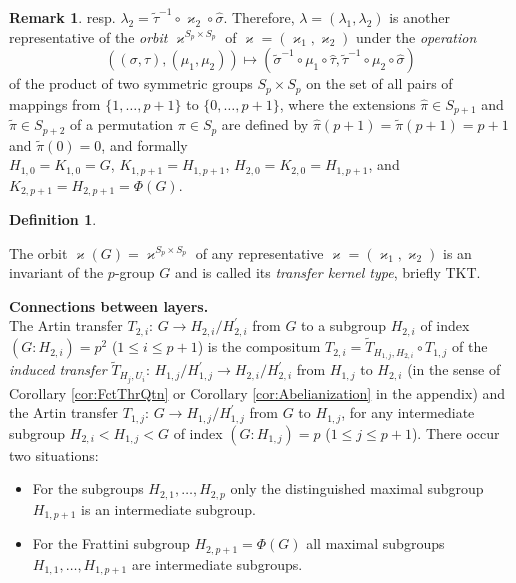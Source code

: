 \documentclass{amsart}
\theoremstyle{definition}
\newtheorem{definition}{Definition}[section]
\newtheorem{remark}{Remark}[section]
\numberwithin{equation}{section}
\begin{document}
\begin{remark}
resp. \(\lambda_2=\tilde{\tau}^{-1}\circ\varkappa_2\circ\hat{\sigma}\).
Therefore, \(\lambda=(\lambda_1,\lambda_2)\) is another representative
of the \textit{orbit} \(\varkappa^{S_p\times S_p}\) of \(\varkappa=(\varkappa_1,\varkappa_2)\)
under the \textit{operation}
\[((\sigma,\tau),(\mu_1,\mu_2))\mapsto
(\tilde{\sigma}^{-1}\circ\mu_1\circ\hat\tau,\tilde{\tau}^{-1}\circ\mu_2\circ\hat\sigma)\]
of the product of two symmetric groups \(S_p\times S_p\)
on the set of all pairs of mappings from \(\lbrace 1,\ldots,p+1\rbrace\) to \(\lbrace 0,\ldots,p+1\rbrace\),
where the extensions \(\hat{\pi}\in S_{p+1}\) and \(\tilde{\pi}\in S_{p+2}\) of a permutation \(\pi\in S_p\) are defined by \(\hat{\pi}(p+1)=\tilde{\pi}(p+1)=p+1\) and \(\tilde{\pi}(0)=0\),
and formally\\
\(H_{1,0}=K_{1,0}=G\), \(K_{1,p+1}=H_{1,p+1}\), \(H_{2,0}=K_{2,0}=H_{1,p+1}\),
and \(K_{2,p+1}=H_{2,p+1}=\Phi(G)\).

\end{remark}

\begin{definition}
\label{dfn:OrbitTypePe2Pe}

The orbit \(\varkappa(G)=\varkappa^{S_p\times S_p}\)
of any representative \(\varkappa=(\varkappa_1,\varkappa_2)\)
is an invariant of the \(p\)-group \(G\) and is called
its \textit{transfer kernel type}, briefly TKT.

\end{definition}


\noindent
\textbf{Connections between layers.}\\
The Artin transfer \(T_{2,i}:\,G\to H_{2,i}/H_{2,i}^\prime\)
from \(G\) to a subgroup \(H_{2,i}\) of index \((G:H_{2,i})=p^2\) (\(1\le i\le p+1\))
is the compositum \(T_{2,i}=\tilde{T}_{H_{1,j},H_{2,i}}\circ T_{1,j}\)
of the \textit{induced transfer}
\(\tilde{T}_{H_j,U_i}:\,H_{1,j}/H_{1,j}^\prime\to H_{2,i}/H_{2,i}^\prime\) from \(H_{1,j}\) to \(H_{2,i}\)
(in the sense of Corollary
\ref{cor:FctThrQtn}
or Corollary
\ref{cor:Abelianization}
in the appendix)
and the Artin transfer \(T_{1,j}:\,G\to H_{1,j}/H_{1,j}^\prime\) from \(G\) to \(H_{1,j}\),
for any intermediate subgroup \(H_{2,i}<H_{1,j}<G\) of index \((G:H_{1,j})=p\) (\(1\le j\le p+1\)).
There occur two situations:

\begin{itemize}

\item
For the subgroups \(H_{2,1},\ldots,H_{2,p}\)
only the distinguished maximal subgroup \(H_{1,p+1}\) is an intermediate subgroup.

\item
For the Frattini subgroup \(H_{2,p+1}=\Phi(G)\)
all maximal subgroups \(H_{1,1},\ldots,H_{1,p+1}\) are intermediate subgroups.

\end{itemize}
\end{document}
